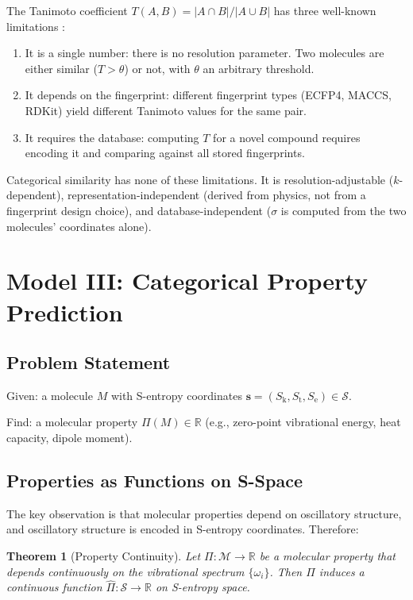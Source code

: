 \documentclass[11pt,twocolumn,a4paper]{article}
\newtheorem{theorem}{Theorem}[section]
\theoremstyle{definition}
\theoremstyle{remark}
\newcommand{\Sk}{S_{\mathrm{k}}}
\newcommand{\St}{S_{\mathrm{t}}}
\newcommand{\Se}{S_{\mathrm{e}}}
\newcommand{\Sspace}{\mathcal{S}}
\newcommand{\Real}{\mathbb{R}}
\begin{document}
The Tanimoto coefficient $T(A,B) = |A \cap B|/|A \cup B|$ has three well-known limitations \citep{bajusz2015}:
\begin{enumerate}[nosep]
\item It is a single number: there is no resolution parameter. Two molecules are either similar ($T > \theta$) or not, with $\theta$ an arbitrary threshold.
\item It depends on the fingerprint: different fingerprint types (ECFP4, MACCS, RDKit) yield different Tanimoto values for the same pair.
\item It requires the database: computing $T$ for a novel compound requires encoding it and comparing against all stored fingerprints.
\end{enumerate}

Categorical similarity has none of these limitations. It is resolution-adjustable ($k$-dependent), representation-independent (derived from physics, not from a fingerprint design choice), and database-independent ($\sigma$ is computed from the two molecules' coordinates alone).


\section{Model III: Categorical Property Prediction}
\label{sec:model3}

\subsection{Problem Statement}

Given: a molecule $M$ with S-entropy coordinates $\mathbf{s} = (\Sk, \St, \Se) \in \Sspace$.

Find: a molecular property $\Pi(M) \in \Real$ (e.g., zero-point vibrational energy, heat capacity, dipole moment).

\subsection{Properties as Functions on S-Space}

The key observation is that molecular properties depend on oscillatory structure, and oscillatory structure is encoded in S-entropy coordinates. Therefore:

\begin{theorem}[Property Continuity]
\label{thm:property_continuity}
Let $\Pi: \mathcal{M} \to \Real$ be a molecular property that depends continuously on the vibrational spectrum $\{\omega_i\}$. Then $\Pi$ induces a continuous function $\hat{\Pi}: \Sspace \to \Real$ on S-entropy space.
\end{theorem}
\end{document}

